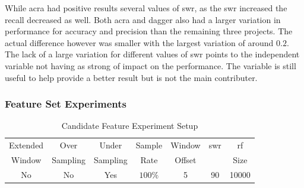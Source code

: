 While acra had positive results several values of \gls{swr}, as the \gls{swr} increased the recall decreased as well. Both acra and dagger also had a larger variation in performance for accuracy and precision than the remaining three projects. The actual difference however was smaller with the largest variation of around $0.2$. The lack of a large variation for different values of \gls{swr} points to the independent variable not having as strong of impact on the performance. The variable is still useful to help provide a better result but is not the main contributer.

\subsubsection{Feature Set Experiments}
\label{sec:feature_set_experiment_rf}

\begin{table}[h]
\begin{center}

    \begin{tabular}{|c|c|c|c|c|c|c|}
        \hline
        Extended & Over & Under & Sample & Window & \gls{swr} & \gls{rf} \\
        Window & Sampling & Sampling & Rate & Offset &  & Size \\ \hline
        No & No & Yes & $100\%$ & 5 & 90 & 10000 \\ \hline
    \end{tabular}
    \caption{Candidate Feature Experiment Setup}
    \label{tab:rf_feature_experiment_setup}
\end{center}

\end{table}



